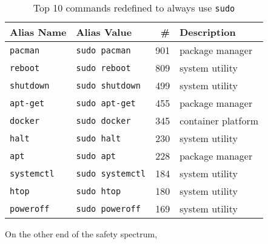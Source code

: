   \begin{table}
      \caption{Top 10 commands redefined to always use \texttt{sudo}}
      \label{tab:sudo-redefine}
      \begin{tabular}{llrl}
        \toprule
        Alias Name & Alias Value & \# & Description \\
        \midrule
        \verb|pacman|    & \verb|sudo pacman|    & 901 & package manager \\
        \verb|reboot|    & \verb|sudo reboot|    & 809 & system utility \\
        \verb|shutdown|  & \verb|sudo shutdown|  & 499 & system utility \\
        \verb|apt-get|   & \verb|sudo apt-get|   & 455 & package manager \\
        \verb|docker|    & \verb|sudo docker|    & 345 & container platform \\
        \verb|halt|      & \verb|sudo halt|      & 230 & system utility \\
        \verb|apt|       & \verb|sudo apt|       & 228 & package manager \\
        \verb|systemctl| & \verb|sudo systemctl| & 184 & system utility \\
        \verb|htop|      & \verb|sudo htop|      & 180 & system utility \\
        \verb|poweroff|  & \verb|sudo poweroff|  & 169 & system utility \\
        \bottomrule
      \end{tabular}
  \end{table}

On the other end of the safety spectrum, \TODO

